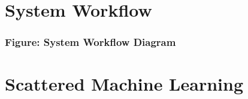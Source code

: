 \documentclass[letterpaper]{article}
\begin{document}
\section[System Workflow]{\textbf{System Workflow}}
\centering
{}
\par

\bigskip

\subsubsection[Figure: System Workflow Diagram]{\textbf{Figure:} System Workflow Diagram}

\bigskip


\bigskip


\bigskip

\section[Scattered Machine Learning]{\textbf{Scattered Machine Learning}}
\end{document}
